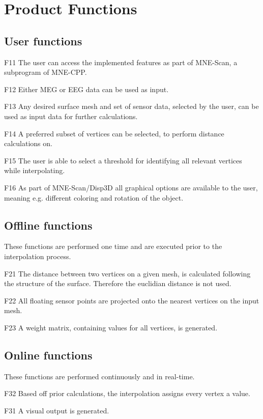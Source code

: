 \section{Product Functions}

\subsection{User functions}

	\begin{aims}
	
		\item[F11] The user can access the implemented features as part of MNE-Scan, a subprogram of MNE-CPP.
		\item[F12] Either MEG or EEG data can be used as input.
		\item[F13] Any desired surface mesh and set of sensor data, selected by the user, can be used as input data for 							further calculations.
		\item[F14] A preferred subset of vertices can be selected, to perform distance calculations on. 
		\item[F15] The user is able to select a threshold for identifying all relevant vertices while interpolating. 
		\item[F16] As part of MNE-Scan/Disp3D all graphical options are available to the user, meaning e.g. different 								coloring and rotation of the object.
	
	\end{aims}

\subsection{Offline functions}
	
	These functions are performed one time and are executed prior to the interpolation process.	
	
	\begin{aims}
	
		\item[F21]	The distance between two vertices on a given mesh, is calculated following the structure of the surface. 						Therefore the euclidian distance is not used.
		\item[F22] All floating sensor points are projected onto the nearest vertices on the input mesh. 
		\item[F23] A weight matrix, containing values for all vertices, is generated. 
 	
	\end{aims}
	
\subsection{Online functions}

	These functions are performed continuously and in real-time.	
	
	\begin{aims}
	
		\item[F32]	Based off prior calculations, the interpolation assigns every vertex a value.
		\item[F31] A visual output is generated.
	
	\end{aims}
